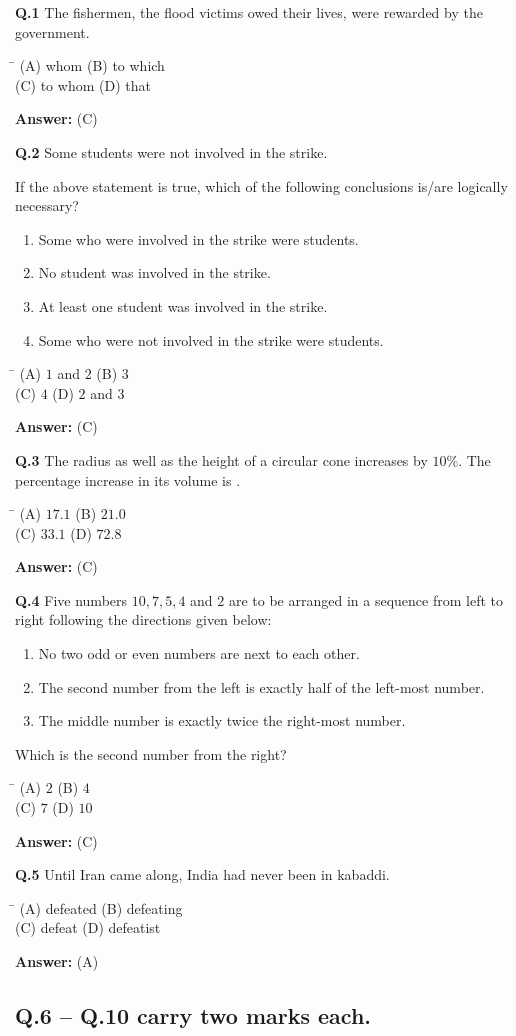 \documentclass[11pt,a4paper]{article}
\newcommand{\optsfourA}[4]{%
  \begin{tabbing}
    \hspace{0.48\linewidth}\=\kill
    (A) #1 \> (B) #2 \\[2pt]
    (C) #3 \> (D) #4
  \end{tabbing}%
}
\newcommand{\ans}[1]{\textbf{Answer:} #1\par\medskip}
\begin{document}
\textbf{Q.1} The fishermen, \underline{\hspace{2cm}} the flood victims owed their lives, were rewarded by the government.
\optsfourA{whom}{to which}{to whom}{that}
\ans{(C)}

\textbf{Q.2} Some students were not involved in the strike.

If the above statement is true, which of the following conclusions is/are logically necessary?
\begin{enumerate}
  \setlength{\itemsep}{1pt}\setlength{\parskip}{0pt}
  \item Some who were involved in the strike were students.
  \item No student was involved in the strike.
  \item At least one student was involved in the strike.
  \item Some who were not involved in the strike were students.
\end{enumerate}
\optsfourA{$1$ and $2$}{$3$}{$4$}{$2$ and $3$}
\ans{(C)}

\textbf{Q.3} The radius as well as the height of a circular cone increases by $10\%$. The percentage increase in its volume is \underline{\hspace{2cm}}.
\optsfourA{$17.1$}{$21.0$}{$33.1$}{$72.8$}
\ans{(C)}

\textbf{Q.4} Five numbers $10, 7, 5, 4$ and $2$ are to be arranged in a sequence from left to right following the directions given below:
\begin{enumerate}
  \setlength{\itemsep}{1pt}\setlength{\parskip}{0pt}
  \item No two odd or even numbers are next to each other.
  \item The second number from the left is exactly half of the left-most number.
  \item The middle number is exactly twice the right-most number.
\end{enumerate}
Which is the second number from the right?
\optsfourA{$2$}{$4$}{$7$}{$10$}
\ans{(C)}

\textbf{Q.5} Until Iran came along, India had never been \underline{\hspace{2.5cm}} in kabaddi.
\optsfourA{defeated}{defeating}{defeat}{defeatist}
\ans{(A)}

\subsection*{Q.6 -- Q.10 carry two marks each.}
\end{document}
